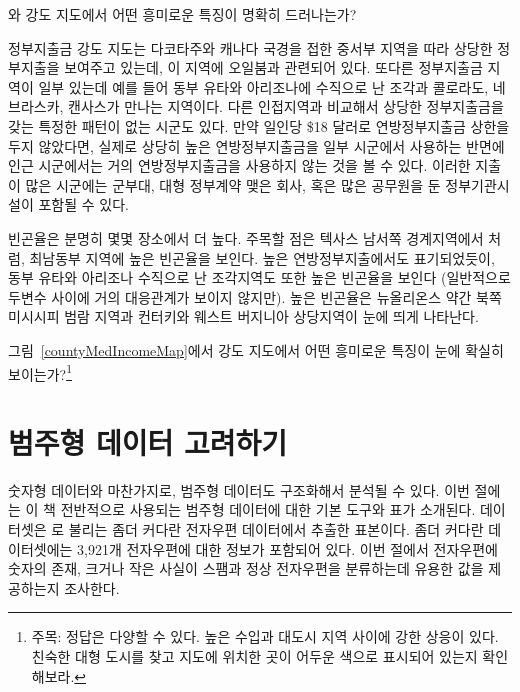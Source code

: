 \begin{example}{ 와  강도 지도에서 어떤 흥미로운 특징이 명확히 드러나는가?}

정부지출금 강도 지도는 다코타주와 캐나다 국경을 접한 중서부 지역을 따라 상당한 정부지출을 보여주고 있는데, 이 지역에 오일붐과 관련되어 있다. 또다른 정부지출금 지역이 일부 있는데 예를 들어 동부 유타와 아리조나에 수직으로 난 조각과 콜로라도, 네브라스카, 캔사스가 만나는 지역이다. 다른 인접지역과 비교해서 상당한 정부지출금을 갖는 특정한 패턴이 없는 시군도 있다. 만약 일인당 \$18 달러로 연방정부지출금 상한을 두지 않았다면, 실제로 상당히 높은 연방정부지출금을 일부 시군에서 사용하는 반면에 인근 시군에서는 거의 연방정부지출금을 사용하지 않는 것을 볼 수 있다.
이러한 지출이 많은 시군에는 군부대, 대형 정부계약 맺은 회사, 혹은 많은 공무원을 둔 정부기관시설이 포함될 수 있다.

빈곤율은 분명히 몇몇 장소에서 더 높다. 주목할 점은 텍사스 남서쪽 경계지역에서 처럼, 최남동부 지역에 높은 빈곤율을 보인다.
높은 연방정부지출에서도 표기되었듯이, 동부 유타와 아리조나 수직으로 난 조각지역도 또한 높은 빈곤율을 보인다 (일반적으로 두변수 사이에 거의 대응관계가 보이지 않지만). 높은 빈곤율은 뉴올리온스 약간 북쪽 미시시피 범람 지역과 컨터키와 웨스트 버지니아 상당지역이 눈에 띄게 나타난다.
\end{example}

\begin{exercise}
그림~\ref{countyMedIncomeMap}에서  강도 지도에서 어떤 흥미로운 특징이 눈에 확실히 보이는가?\footnote{주목: 정답은 다양할 수 있다. 높은 수입과 대도시 지역 사이에 강한 상응이 있다.
친숙한 대형 도시를 찾고 지도에 위치한 곳이 어두운 색으로 표시되어 있는지 확인해보라.}
\end{exercise}




\textC{\newpage}

\section[Considering categorical data]{범주형 데이터 고려하기 }
\label{categoricalData}


숫자형 데이터와 마찬가지로, 범주형 데이터도 구조화해서 분석될 수 있다. 이번 절에는 이 책 전반적으로 사용되는 범주형 데이터에 대한 기본 도구와 표가 소개된다.  데이터셋은 로 불리는 좀더 커다란 전자우편 데이터에서 추출한 표본이다. 좀더 커다란 데이터셋에는 3,921개 전자우편에 대한 정보가 포함되어 있다. 이번 절에서 전자우편에 숫자의 존재, 크거나 작은 사실이 스팸과 정상 전자우편을 분류하는데 유용한 값을 제공하는지 조사한다.

